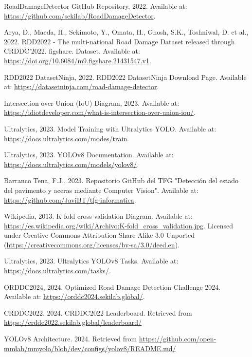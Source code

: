 \begin{thebibliography}{99}
        RoadDamageDetector GitHub Repository, 2022. Available at: \url{https://github.com/sekilab/RoadDamageDetector}.

        Arya, D., Maeda, H., Sekimoto, Y., Omata, H., Ghosh, S.K., Toshniwal, D. et al., 2022. RDD2022 - The multi-national Road Damage Dataset released through CRDDC'2022. figshare. Dataset. Available at: \url{https://doi.org/10.6084/m9.figshare.21431547.v1}.

        RDD2022 DatasetNinja, 2022. RDD2022 DatasetNinja Download Page. Available at: \url{https://datasetninja.com/road-damage-detector}.

        Intersection over Union (IoU) Diagram, 2023. Available at: \url{https://idiotdeveloper.com/what-is-intersection-over-union-iou/}.

        Ultralytics, 2023. Model Training with Ultralytics YOLO. Available at: \url{https://docs.ultralytics.com/modes/train}.

        Ultralytics, 2023. YOLOv8 Documentation. Available at: \url{https://docs.ultralytics.com/models/yolov8/}.

        Barranco Tena, F.J., 2023. Repositorio GitHub del TFG "Detección del estado del pavimento y aceras mediante Computer Vision". Available at: \url{https://github.com/JaviBT/tfg-informatica}.

        Wikipedia, 2013. K-fold cross-validation Diagram. Available at: \url{https://es.wikipedia.org/wiki/Archivo:K-fold_cross_validation.jpg}. Licensed under Creative Commons Attribution-Share Alike 3.0 Unported (\url{https://creativecommons.org/licenses/by-sa/3.0/deed.en}).

        Ultralytics, 2023. Ultralytics YOLOv8 Tasks. Available at: \url{https://docs.ultralytics.com/tasks/}.

        ORDDC2024, 2024. Optimized Road Damage Detection Challenge 2024. Available at: \url{https://orddc2024.sekilab.global/}.

        CRDDC2022. 2024. CRDDC2022 Leaderboard. Retrieved from \url{https://crddc2022.sekilab.global/leaderboard/}
    
        YOLOv8 Architecture. 2024. Retrieved from \url{https://github.com/open-mmlab/mmyolo/blob/dev/configs/yolov8/README.md/}


        
\end{thebibliography}  
